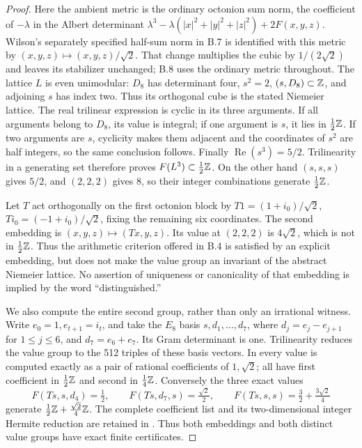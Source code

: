 \begin{proof}
Here the ambient metric is the ordinary octonion sum norm, the
coefficient of \(-\lambda\) in the Albert determinant
\(\lambda^3-\lambda(|x|^2+|y|^2+|z|^2)+2F(x,y,z)\).
Wilson's separately specified half-sum norm in B.7 is identified
with this metric by \((x,y,z)\mapsto(x,y,z)/\sqrt2\).
That change multiplies the cubic by \(1/(2\sqrt2)\) and leaves
its stabilizer unchanged; B.8 uses the ordinary metric throughout.
The lattice \(L\) is even unimodular: \(D_8\) has determinant four,
\(s^2=2\), \((s,D_8)\subset\mathbb Z\), and adjoining \(s\) has index
two. Thus its orthogonal cube is the stated Niemeier lattice.
The real trilinear expression is cyclic in its three arguments.
If all arguments belong to \(D_8\), its value is integral; if one
argument is \(s\), it lies in \(\tfrac12\mathbb Z\). If two arguments
are \(s\), cyclicity makes them adjacent and the coordinates of
\(s^2\) are half integers, so the same conclusion follows. Finally
\(\operatorname{Re}(s^3)=5/2\). Trilinearity in a generating set
therefore proves \(F(L^3)\subset\tfrac12\mathbb Z\). On the other hand
\((s,s,s)\) gives \(5/2\), and \((2,2,2)\) gives 8, so their
integer combinations generate \(\tfrac12\mathbb Z\).

Let \(T\) act orthogonally on the first octonion block by
\(T1=(1+i_0)/\sqrt2\), \(Ti_0=(-1+i_0)/\sqrt2\), fixing the
remaining six coordinates. The second embedding is
\((x,y,z)\mapsto(Tx,y,z)\). Its value at \((2,2,2)\) is
\(4\sqrt2\), which is not in \(\tfrac12\mathbb Z\). Thus the arithmetic
criterion offered in B.4 is satisfied by an explicit embedding, but
does not make the value group an invariant of the abstract Niemeier
lattice. No assertion of uniqueness or canonicality of that embedding
is implied by the word ``distinguished.''

We also compute the entire second group, rather than only an
irrational witness. Write \(e_0=1,e_{t+1}=i_t\), and take the
\(E_8\) basis
\(s,d_1,\ldots,d_7\), where
\(d_j=e_j-e_{j+1}\) for \(1\le j\le6\), and
\(d_7=e_6+e_7\). Its Gram determinant is one. Trilinearity reduces
the value group to the 512 triples of these basis vectors.
In  every value is computed exactly
as a pair of rational coefficients of \(1,\sqrt2\); all have
first coefficient in \(\tfrac12\mathbb Z\) and second in
\(\tfrac14\mathbb Z\). Conversely the three exact values
\[
 F(Ts,s,d_4)=\tfrac12,\qquad
 F(Ts,d_7,s)=\tfrac{\sqrt2}{2},\qquad
 F(Ts,s,s)=\tfrac32+\tfrac{3\sqrt2}{4}
\]
generate \(\tfrac12\mathbb Z+\tfrac{\sqrt2}{4}\mathbb Z\). The complete
coefficient list and its two-dimensional integer Hermite reduction
are retained in . Thus both embeddings
and both distinct value groups have exact finite certificates.
\end{proof}

